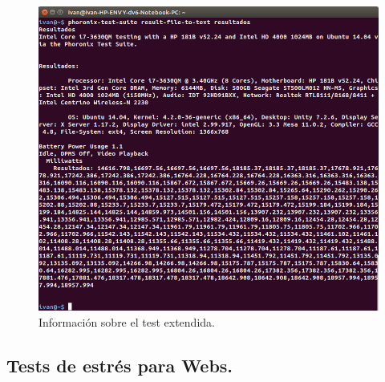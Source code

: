 \begin{itemize}
	\begin{figure}[H]
		\centering
		\includegraphics[width=0.7\linewidth]{resultados_phoronix}
		\caption[resultados\_phoronix]{Información sobre el test extendida.}
		\label{fig:resultados_phoronix}
	\end{figure}


\end{itemize}

\subsection{Tests de estrés para Webs.}

